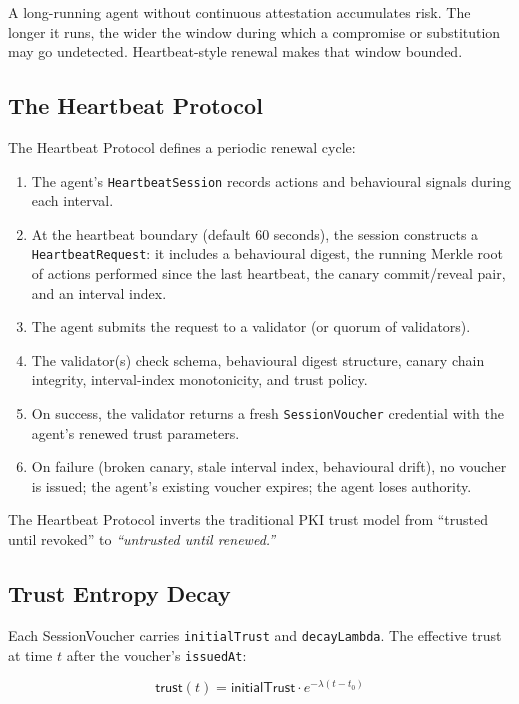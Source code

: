 \documentclass[11pt,a4paper,twocolumn]{article}
\begin{document}
A long-running agent without continuous attestation accumulates risk. The longer it runs, the wider the window during which a compromise or substitution may go undetected. Heartbeat-style renewal makes that window bounded.

\subsection{The Heartbeat Protocol}

The Heartbeat Protocol defines a periodic renewal cycle:

\begin{enumerate}[label=\arabic*.,leftmargin=*]
\item The agent's \verb|HeartbeatSession| records actions and behavioural signals during each interval.
\item At the heartbeat boundary (default 60 seconds), the session constructs a \verb|HeartbeatRequest|: it includes a behavioural digest, the running Merkle root of actions performed since the last heartbeat, the canary commit/reveal pair, and an interval index.
\item The agent submits the request to a validator (or quorum of validators).
\item The validator(s) check schema, behavioural digest structure, canary chain integrity, interval-index monotonicity, and trust policy.
\item On success, the validator returns a fresh \verb|SessionVoucher| credential with the agent's renewed trust parameters.
\item On failure (broken canary, stale interval index, behavioural drift), no voucher is issued; the agent's existing voucher expires; the agent loses authority.
\end{enumerate}

The Heartbeat Protocol inverts the traditional PKI trust model from ``trusted until revoked'' to \emph{``untrusted until renewed.''}

\subsection{Trust Entropy Decay}

Each SessionVoucher carries \texttt{initialTrust} and \texttt{decayLambda}. The effective trust at time $t$ after the voucher's \texttt{issuedAt}:

\[
\textsf{trust}(t) = \textsf{initialTrust} \cdot e^{-\lambda (t - t_0)}
\]
\end{document}
